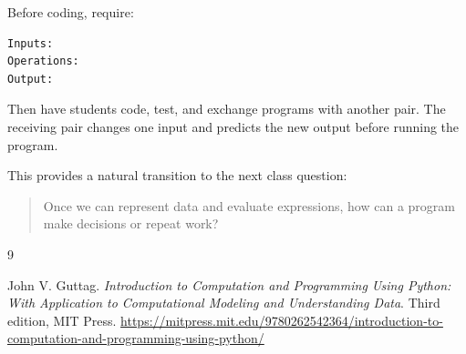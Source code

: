 \documentclass[11pt]{article}
\begin{document}
Before coding, require:

\begin{verbatim}
Inputs:
Operations:
Output:
\end{verbatim}

Then have students code, test, and exchange programs with another pair.
The receiving pair changes one input and predicts the new output before running the program.

This provides a natural transition to the next class question:

\begin{quote}
Once we can represent data and evaluate expressions, how can a program make decisions or repeat work?
\end{quote}

\begin{thebibliography}{9}

John V. Guttag.
\newblock \emph{Introduction to Computation and Programming Using Python: With Application to Computational Modeling and Understanding Data}.
\newblock Third edition, MIT Press.
\newblock \url{https://mitpress.mit.edu/9780262542364/introduction-to-computation-and-programming-using-python/}

\end{thebibliography}
\end{document}
